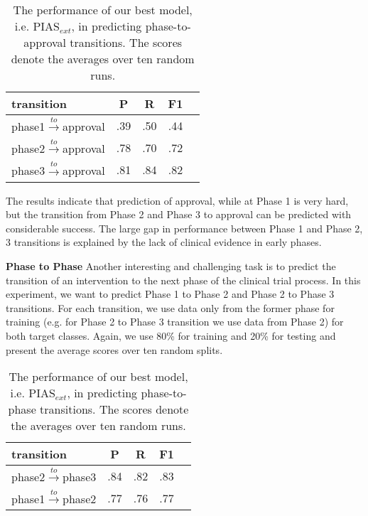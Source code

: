 \documentclass[11pt]{article}
\begin{document}
\begin{table}[htp]
\centering
\begin{tabular}{lcccc}
\hline
\textbf{transition} &\textbf{P} & \textbf{R} & \textbf{F1}\\
\hline
phase1$\xrightarrow{to}$approval & .39 & .50 & .44 \\ 
phase2$\xrightarrow{to}$approval & .78 & .70 & .72 \\ 
phase3$\xrightarrow{to}$approval & .81 & .84 & .82 \\ 

\hline
\end{tabular}

\caption{The performance of our best model, i.e. PIAS$_{ext}$, in predicting phase-to-approval transitions. The scores denote the averages over ten random runs.}
\label{tab:phase1}
\end{table}


The results indicate that prediction of approval, while at Phase 1 is very hard, but the transition from Phase 2  and Phase 3 to approval can be predicted with considerable success. The large gap in performance between Phase 1 and Phase 2, 3 transitions is explained by the lack of clinical evidence in early phases.

\textbf{Phase to Phase}
Another interesting and challenging task is to predict the transition of an intervention to the next phase of the clinical trial process. 
In this experiment, we want to predict Phase 1 to Phase 2 and Phase 2 to Phase 3 transitions. For each transition, we use data only from the former phase for training (e.g. for Phase 2 to Phase 3 transition we use data from Phase 2) for both target classes. Again, we use 80\% for training and 20\% for testing and present the average scores over ten random splits.

\begin{table}[htp]
\centering
\begin{tabular}{lcccc}
\hline
\textbf{transition} &\textbf{P} & \textbf{R} & \textbf{F1}\\
\hline
phase2$\xrightarrow{to}$phase3 & .84 & .82 & .83 \\ 
phase1$\xrightarrow{to}$phase2 & .77 & .76 & .77 \\ 
\hline
\end{tabular}

\caption{The performance of our best model, i.e. PIAS$_{ext}$, in predicting phase-to-phase transitions. The scores denote the averages over ten random runs.}
\label{tab:phase2}
\end{table}
\end{document}
